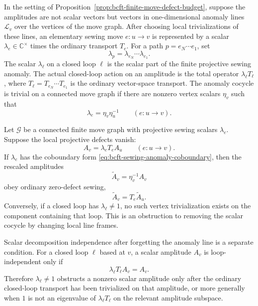 \begin{definition}
\label{def:bcft-finite-sewing-anomaly-cocycle}
In the setting of Proposition~\ref{prop:bcft-finite-move-defect-budget},
suppose the amplitudes are not scalar vectors but vectors in one-dimensional
anomaly lines \(\mathcal L_v\) over the vertices of the move graph.  After
choosing local trivializations of these lines, an elementary sewing move
\(e:u\to v\) is represented by a scalar \(\lambda_e\in\mathbb C^\times\)
times the ordinary transport \(T_e\).  For a path
\(p=e_N\cdots e_1\), set
\[
  \lambda_p=\lambda_{e_N}\cdots\lambda_{e_1}.
\]
The scalar \(\lambda_\ell\) on a closed loop \(\ell\) is the scalar part of
the finite projective sewing anomaly.  The actual closed-loop action on an
amplitude is the total operator \(\lambda_\ell T_\ell\), where
\(T_\ell=T_{e_N}\cdots T_{e_1}\) is the ordinary vector-space transport.  The
anomaly cocycle is trivial on a connected move graph if there are nonzero
vertex scalars \(\eta_v\) such that
\begin{equation}
  \lambda_e=\eta_v\eta_u^{-1}
  \qquad(e:u\to v).
  \label{eq:bcft-sewing-anomaly-coboundary}
\end{equation}
\end{definition}

\begin{proposition}
\label{prop:bcft-finite-sewing-anomaly-trivialization}
Let \(\mathcal G\) be a connected finite move graph with projective sewing
scalars \(\lambda_e\).  Suppose the local projective defects vanish:
\[
  A_v=\lambda_e T_e A_u
  \qquad(e:u\to v).
\]
If \(\lambda_e\) has the coboundary form
\eqref{eq:bcft-sewing-anomaly-coboundary}, then the rescaled amplitudes
\[
  \widetilde A_v=\eta_v^{-1}A_v
\]
obey ordinary zero-defect sewing,
\[
  \widetilde A_v=T_e\widetilde A_u .
\]
Conversely, if a closed loop has \(\lambda_\ell\ne1\), no such vertex
trivialization exists on the component containing that loop.  This is an
obstruction to removing the scalar cocycle by changing local line frames.

Scalar decomposition independence after forgetting the anomaly line is a
separate condition.  For a closed loop \(\ell\) based at \(v\), a scalar
amplitude \(A_v\) is loop-independent only if
\begin{equation}
  \lambda_\ell T_\ell A_v=A_v .
  \label{eq:bcft-total-projective-loop-transport}
\end{equation}
Therefore \(\lambda_\ell\ne1\) obstructs a nonzero scalar amplitude only after
the ordinary closed-loop transport has been trivialized on that amplitude, or
more generally when \(1\) is not an eigenvalue of \(\lambda_\ell T_\ell\) on
the relevant amplitude subspace.
\end{proposition}

